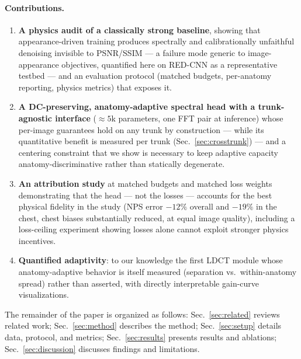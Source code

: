 \paragraph{Contributions.}
\begin{enumerate}
  \item \textbf{A physics audit of a classically strong baseline}, showing that appearance-driven training produces spectrally and calibrationally unfaithful denoising invisible to PSNR/SSIM --- a failure mode generic to image-appearance objectives, quantified here on RED-CNN as a representative testbed --- and an evaluation protocol (matched budgets, per-anatomy reporting, physics metrics) that exposes it.
  \item \textbf{A DC-preserving, anatomy-adaptive spectral head with a trunk-agnostic interface} (${\approx}5$k parameters, one FFT pair at inference) whose per-image guarantees hold on any trunk by construction --- while its quantitative benefit is measured per trunk (Sec.~\ref{sec:crosstrunk}) --- and a centering constraint that we show is necessary to keep adaptive capacity anatomy-discriminative rather than statically degenerate.
  \item \textbf{An attribution study} at matched budgets and matched loss weights demonstrating that the head --- not the losses --- accounts for the best physical fidelity in the study (NPS error $-12\%$ overall and $-19\%$ in the chest, chest biases substantially reduced, at equal image quality), including a loss-ceiling experiment showing losses alone cannot exploit stronger physics incentives.
  \item \textbf{Quantified adaptivity}: to our knowledge the first LDCT module whose anatomy-adaptive behavior is itself measured (separation vs.\ within-anatomy spread) rather than asserted, with directly interpretable gain-curve visualizations.
\end{enumerate}

The remainder of the paper is organized as follows: Sec.~\ref{sec:related} reviews related work; Sec.~\ref{sec:method} describes the method; Sec.~\ref{sec:setup} details data, protocol, and metrics; Sec.~\ref{sec:results} presents results and ablations; Sec.~\ref{sec:discussion} discusses findings and limitations.
